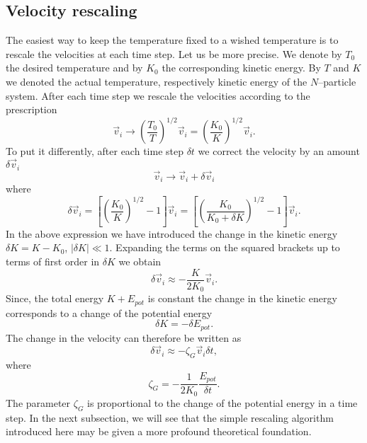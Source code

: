 \subsection{Velocity rescaling}
The easiest way to keep the temperature fixed to a wished temperature
is to rescale the velocities at each time step. Let us be more precise. We
denote by $T_0$ the desired temperature and by $K_0$ the corresponding kinetic
energy. By $T$ and $K$ we denoted the actual temperature, respectively kinetic
energy of the $N$--particle system. After each time step we rescale 
the velocities according to the prescription
\begin{displaymath}
  \vec{v}_i \longrightarrow \left( \frac{T_0}{T} \right)^{1/2} \vec{v}_i
          = \left( \frac{K_0}{K} \right)^{1/2} \vec{v}_i.
\end{displaymath}
To put it differently, after each time step $\delta t$ we correct the velocity
by an amount $\delta \vec{v}_i$
\begin{displaymath}
  \vec{v}_i \longrightarrow \vec{v}_i + \delta \vec{v}_i
\end{displaymath}
where
\begin{displaymath}
  \delta \vec{v}_i = \left[ \left( 
                  \frac{K_0}{K}\right)^{1/2} -1  
                       \right]\vec{v}_i 
                    = \left[ \left(
                        \frac{K_0}{K_0 + \delta K}\right)^{1/2} -1 
                       \right]\vec{v}_i.  
\end{displaymath}
In the above expression we have introduced the change in the kinetic energy 
$\delta K = K- K_0$, $|\delta K| \ll 1$. Expanding the terms on the squared
brackets up to terms of first order in $\delta K$ we obtain
\begin{displaymath}
  \delta \vec{v}_i \approx - \frac{K}{2K_0} \vec{v}_i.
\end{displaymath}
Since, the total energy $K + E_{pot}$ is constant the change in the kinetic
energy corresponds to a change of the potential energy
\begin{displaymath}
\delta K = - \delta E_{pot}.  
\end{displaymath}
The change in the velocity can therefore be written as
\begin{displaymath}
  \delta \vec{v}_i \approx - \zeta_G \vec{v}_i \delta t,
\end{displaymath}
where 
\begin{displaymath}
  \zeta_G = - \frac{1}{2K_0} \frac{E_{pot}}{\delta t}.
\end{displaymath}
The parameter $\zeta_G$ is proportional to the change of the potential energy
in a time step. In the next subsection, we will see that the simple rescaling
algorithm introduced here may be given a more profound theoretical foundation.

